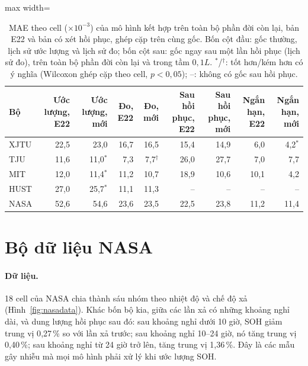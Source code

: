 \documentclass[12pt,a4paper,oneside]{report}
\theoremstyle{plain}
\theoremstyle{definition}
\begin{document}
\begin{table}[!htbp]\centering\small
\caption[Dự báo có và không xét hồi phục dung lượng]{MAE theo cell ($\times10^{-3}$) của mô hình kết hợp trên toàn bộ phần đời còn lại, bản E22 và bản có xét hồi phục, ghép cặp trên cùng gốc. Bốn cột đầu: gốc thường, lịch sử ước lượng và lịch sử đo; bốn cột sau: gốc ngay sau một lần hồi phục (lịch sử đo), trên toàn bộ phần đời còn lại và trong tầm $0{,}1L$. $^{*}$/$^{\dagger}$: tốt hơn/kém hơn có ý nghĩa (Wilcoxon ghép cặp theo cell, $p < 0{,}05$); --: không có gốc sau hồi phục.}\label{tab:e23}
\begin{adjustbox}{max width=\textwidth}\begin{tabular}{lrrrrrrrr}\toprule
Bộ & Ước lượng, E22 & Ước lượng, mới & Đo, E22 & Đo, mới & Sau hồi phục, E22 & Sau hồi phục, mới & Ngắn hạn, E22 & Ngắn hạn, mới \\\midrule
XJTU & 22{,}5 & 23{,}0 & 16{,}7 & 16{,}5 & 15{,}4 & 14{,}9 & 6{,}0 & 4{,}2$^{*}$ \\
TJU & 11{,}6 & 11{,}0$^{*}$ & 7{,}3 & 7{,}7$^{\dagger}$ & 26{,}0 & 27{,}7 & 7{,}0 & 7{,}7 \\
MIT & 12{,}0 & 11{,}4$^{*}$ & 11{,}2 & 10{,}7 & 18{,}9 & 10{,}6 & 10{,}1 & 4{,}2 \\
HUST & 27{,}0 & 25{,}7$^{*}$ & 11{,}1 & 11{,}3 & -- & -- & -- & -- \\
NASA & 52{,}6 & 54{,}6 & 23{,}6 & 23{,}5 & 22{,}5 & 23{,}8 & 11{,}2 & 11{,}4 \\
\bottomrule\end{tabular}\end{adjustbox}\end{table}



\section{Bộ dữ liệu NASA}\label{sec:nasares}

\paragraph{Dữ liệu.} 18 cell của NASA chia thành sáu nhóm theo nhiệt độ và chế độ xả (Hình~\ref{fig:nasadata}). Khác
bốn bộ kia, giữa các lần xả có những khoảng nghỉ dài, và dung lượng hồi phục sau đó: sau khoảng nghỉ dưới 10 giờ, SOH
giảm trung vị 0{,}27\,\% so với lần xả trước; sau khoảng nghỉ 10--24 giờ, nó tăng trung vị 0{,}40\,\%; sau khoảng nghỉ
từ 24 giờ trở lên, tăng trung vị 1{,}36\,\%. Đây là các mẫu gây nhiễu mà mọi mô hình phải xử lý khi ước lượng SOH.
\end{document}

